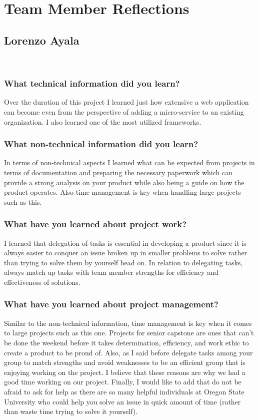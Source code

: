 \section{Team Member Reflections}
\subsection{Lorenzo Ayala}\\
\subsubsection{What technical information did you learn?}
\noindent Over the duration of this project I learned just how extensive a web application can become even from the perspective of adding a micro-service to an existing organization. I also learned one of the most utilized frameworks.\\

\subsubsection{What non-technical information did you learn?}
\noindent In terms of non-technical aspects I learned what can be expected from projects in terms of documentation and preparing the necessary paperwork which can provide a strong analysis on your product while also being a guide on how the product operates. Also time management is key when handling large projects such as this.\\ 

\subsubsection{What have you learned about project work?}
\noindent I learned that delegation of tasks is essential in developing a product since it is always easier to conquer an issue broken up in smaller problems to solve rather than trying to solve them by yourself head on. In relation to delegating tasks, always match up tasks with team member strengths for efficiency and effectiveness of solutions.\\ 

\subsubsection{What have you learned about project management?}
\noindent Similar to the non-technical information, time management is key when it comes to large projects such as this one. Projects for senior capstone are ones that can't be done the weekend before it takes determination, efficiency, and work ethic to create a product to be proud of. Also, as I said before delegate tasks among your group to match strengths and avoid weaknesses to be an efficient group that is enjoying working on the project. I believe that these reasons are why we had a good time working on our project. Finally, I would like to add that do not be afraid to ask for help as there are so many helpful individuals at Oregon State University who could help you solve an issue in quick amount of time (rather than waste time trying to solve it yourself).\\

